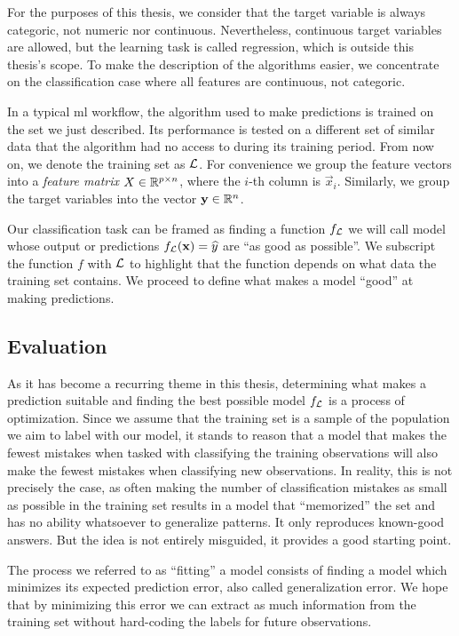For the purposes of this thesis, we consider that the target variable is always
categoric, not numeric nor continuous. Nevertheless, continuous target variables
are allowed, but the learning task is called regression, which is outside this
thesis's scope. To make the description of the algorithms easier, we concentrate
on the classification case where all features are continuous, not categoric.

In a typical \ac{ml} workflow, the algorithm used to make predictions is trained
on the set we just described. Its performance is tested on a different set of
similar data that the algorithm had no access to during its training period.
From now on, we denote the training set as $\mathcal{L}$. For convenience we group the
feature vectors into a \textit{feature matrix} $X \in \mathbb{R}^{p \times n}$, where
the $i$-th column is $\vec{x}_i$. Similarly, we group the target variables into
the vector $\mathbf{y} \in \mathbb{R}^{n}$.

Our classification task can be framed as finding a function $f_{\mathcal{L}}$ we will
call model whose output or predictions $f_{\mathcal{L}} (\mathbf{x}) = \widehat{y}$
are ``as good as possible''. We subscript the function $f$ with $\mathcal{L}$ to
highlight that the function depends on what data the training set contains. We
proceed to define what makes a model ``good'' at making predictions.

\subsection{Evaluation}

As it has become a recurring theme in this thesis, determining what makes a
prediction suitable and finding the best possible model $f_{\mathcal{L}}$ is a process of
optimization. Since we assume that the training set is a sample of the
population we aim to label with our model, it stands to reason that a model that
makes the fewest mistakes when tasked with classifying the training observations
will also make the fewest mistakes when classifying new observations. In
reality, this is not precisely the case, as often making the number of
classification mistakes as small as possible in the training set results in a
model that ``memorized'' the set and has no ability whatsoever to generalize
patterns. It only reproduces known-good answers. But the idea is not entirely
misguided, it provides a good starting point.

The process we referred to as ``fitting'' a model consists of finding a model
which minimizes its expected prediction error, also called generalization error.
We hope that by minimizing this error we can extract as much information from
the training set without hard-coding the labels for future observations.

